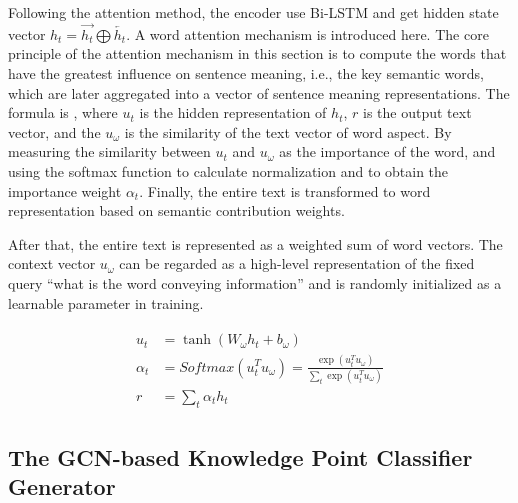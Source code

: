 Following the attention method, the encoder use Bi-LSTM and get hidden state vector \(h_t=\overrightarrow{h_t}\bigoplus \overleftarrow{h_t}\). A word attention mechanism is introduced here. The core principle of the attention mechanism in this section is to compute the words that have the greatest influence on sentence meaning, i.e., the key semantic words, which are later aggregated into a vector of sentence meaning representations. The formula is \eqname{\ref{fml:ch2-att2}}, where \(u_t\) is the hidden representation of \(h_t\), \(r\) is the output text vector, and the \(u_\omega \) is the similarity of the text vector of word aspect. By measuring the similarity between \(u_t\) and \(u_\omega \) as the importance of the word, and using the softmax function to calculate normalization and to obtain the importance weight \(\alpha_{t}\). Finally, the entire text is transformed to word representation based on semantic contribution weights.

%
After that, the entire text is represented as a weighted sum of word vectors. The context vector \(u_\omega \) can be regarded as a high-level representation of the fixed query ``what is the word conveying information'' and is randomly initialized as a learnable parameter in training.


\begin{align}\label{fml:ch2-att2}
    \begin{split}
        u_t      & = \tanh(W_\omega h_t + b_\omega )                                                    \\
        \alpha_t & =Softmax(u_t^T u_\omega) = \frac{\exp( u_t^T u_\omega)}{\sum_t \exp(u_t^T u_\omega)} \\
        r        & = \sum_t{\alpha_t h_t}
    \end{split}
\end{align}

\subsection{The GCN-based Knowledge Point Classifier Generator}

